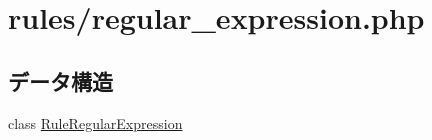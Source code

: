 \hypertarget{regular__expression_8php}{
\section{rules/regular\-\_\-expression.php}
\label{regular__expression_8php}
}
\subsection*{データ構造}
\begin{DoxyCompactItemize}
\item 
class \hyperlink{class_rule_regular_expression}{\-Rule\-Regular\-Expression}
\end{DoxyCompactItemize}
